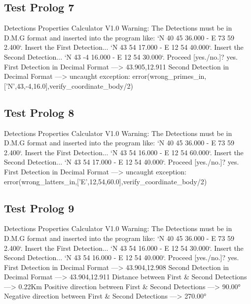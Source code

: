\documentclass{article}
\begin{document}
\subsection*{Test Prolog 7}
	\begin{spverbatim}
		Detections Properties Calculator V1.0
		Warning: The Detections must be in D.M.G format and inserted into the program like: `N 40 45 36.000 - E 73 59 2.400`.
		Insert the First Detection...
		`N 43 54 17.000 - E 12 54 40.000`.
		Insert the Second Detection...
		`N 43 -4 16.000 - E 12 54 30.000`.
		Proceed [yes./no.]?
		yes.
		First Detection in Decimal Format ---> 43.905,12.911
		Second Detection in Decimal Format ---> 
		uncaught exception: error(wrong_primes_in,['N',43,-4,16.0],verify_coordinate_body/2)
	\end{spverbatim}

\subsection*{Test Prolog 8}
	\begin{spverbatim}
		Detections Properties Calculator V1.0
		Warning: The Detections must be in D.M.G format and inserted into the program like: `N 40 45 36.000 - E 73 59 2.400`.
		Insert the First Detection...
		`N 43 54 16.000 - E 12 54 60.000`.
		Insert the Second Detection...
		`N 43 54 17.000 - E 12 54 40.000`.
		Proceed [yes./no.]?
		yes.
		First Detection in Decimal Format ---> 
		uncaught exception: error(wrong_latters_in,['E',12,54,60.0],verify_coordinate_body/2)
	\end{spverbatim}

\subsection*{Test Prolog 9}
	\begin{spverbatim}
		Detections Properties Calculator V1.0
		Warning: The Detections must be in D.M.G format and inserted into the program like: `N 40 45 36.000 - E 73 59 2.400`.
		Insert the First Detection...
		`N 43 54 16.000 - E 12 54 30.000`.
		Insert the Second Detection...
		`N 43 54 16.000 - E 12 54 40.000`.
		Proceed [yes./no.]?
		yes.
		First Detection in Decimal Format ---> 43.904,12.908
		Second Detection in Decimal Format ---> 43.904,12.911
		Distance between First & Second Detections ---> 0.22Km
		Positive direction between First & Second Detections ---> 90.00°
		Negative direction between First & Second Detections ---> 270.00°
	\end{spverbatim}
\end{document}

